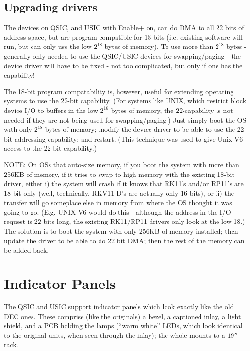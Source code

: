 \section{Upgrading drivers}

The devices on QSIC, and USIC with Enable+ on, can do DMA to all 22 bits of
address space, but are program compatible for 18 bits (i.e. existing software
will run, but can only use the low $2^{18}$ bytes of memory). To use more
than $2^{18}$ bytes - generally only needed to use the QSIC/USIC devices for
swapping/paging - the device driver will have to be fixed - not too
complicated, but only if one has the capability!

The 18-bit program compatability is, however, useful for extending operating
systems to use the 22-bit capability. (For systems like UNIX, which restrict
block device I/O to buffers in the low $2^{16}$ bytes of memory, the
22-capability is not needed if they are not being used for swapping/paging.)
Just simply boot the OS with only $2^{18}$ bytes of memory; modify the device
driver to be able to use the 22-bit addressing capability; and restart. (This
technique was used to give Unix V6 access to the 22-bit capability.)

NOTE: On OSs that auto-size memory, if you boot the system with more than
256KB of memory, if it tries to swap to high memory with the existing 18-bit
driver, either i) the system will crash if it knows that RK11's and/or RP11's
are 18-bit only (well, technically, RKV11-D's are actually only 16 bits), or
ii) the transfer will go someplace else in memory from where the OS thought
it was going to go. (E.g. UNIX V6 would do this - although the address in the
I/O request is 22 bits long, the existing RK11/RP11 drivers only look at the
low 18.) The solution is to boot the system with only 256KB of memory
installed; then update the driver to be able to do 22 bit DMA; then the rest
of the memory can be added back.

\chapter{Indicator Panels}

The QSIC and USIC support indicator panels which look exactly like the old
DEC ones. These comprise (like the originals) a bezel, a captioned inlay, a
light shield, and a PCB holding the lamps (``warm white'' LEDs, which look
identical to the original units, when seen through the inlay); the whole
mounts to a $19''$ rack.

